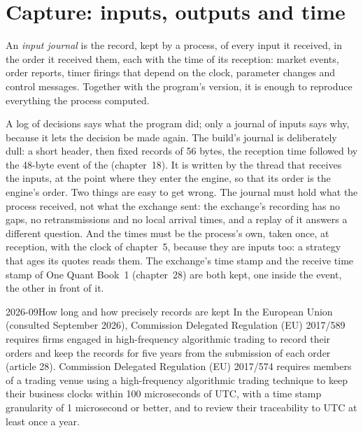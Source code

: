 \section{Capture: inputs, outputs and time}

\begin{definition}\label{def:ll:logging-capture-and-replay:journal}
An \emph{input journal} is the record, kept by a process, of every input it received, in the order it
received them, each with the time of its reception: market events, order reports, timer firings that depend on the clock,
parameter changes and control messages. Together with the program's version, it is enough to reproduce everything the
process computed.
\end{definition}

A log of decisions says what the program did; only a journal of inputs says why, because it lets the decision be made again.
The build's journal is deliberately dull: a short header, then fixed records of 56 bytes, the reception time followed by the
48-byte event of the  (chapter~18). It is written by the thread that receives the inputs, at the point where they
enter the engine, so that its order is the engine's order. Two things are easy to get wrong. The journal must hold what the
process received, not what the exchange sent: the exchange's recording has no gaps, no retransmissions and no local arrival
times, and a replay of it answers a different question. And the times must be the process's own, taken once, at reception,
with the clock of chapter~5, because they are inputs too: a strategy that ages its quotes reads them. The exchange's time
stamp and the receive time stamp of One Quant Book~1 (chapter~28) are both kept, one inside the event, the other in front of it.

\begin{dated}{2026-09}{How long and how precisely records are kept}\label{dat:ll:logging-capture-and-replay:records}
In the European Union (consulted September 2026), Commission Delegated Regulation (EU) 2017/589 requires firms engaged in
high-frequency algorithmic trading to record their orders and keep the records for five years from the submission of each
order (article 28). Commission Delegated Regulation (EU) 2017/574 requires members of a trading venue using a high-frequency
algorithmic trading technique to keep their business clocks within 100 microseconds of UTC, with a time stamp granularity of
1 microsecond or better, and to review their traceability to UTC at least once a year.
\end{dated}


